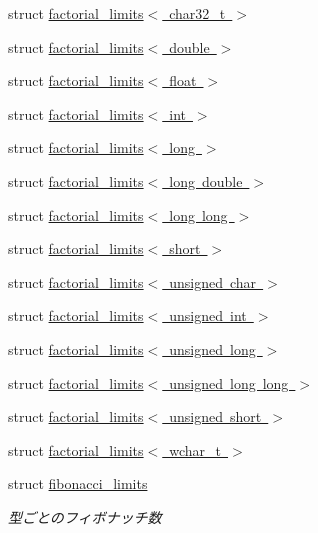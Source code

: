 \begin{DoxyCompactItemize}
\item 
struct \mbox{\hyperlink{structsaki_1_1factorial__limits_3_01char32__t_01_4}{factorial\+\_\+limits$<$ char32\+\_\+t $>$}}
\item 
struct \mbox{\hyperlink{structsaki_1_1factorial__limits_3_01double_01_4}{factorial\+\_\+limits$<$ double $>$}}
\item 
struct \mbox{\hyperlink{structsaki_1_1factorial__limits_3_01float_01_4}{factorial\+\_\+limits$<$ float $>$}}
\item 
struct \mbox{\hyperlink{structsaki_1_1factorial__limits_3_01int_01_4}{factorial\+\_\+limits$<$ int $>$}}
\item 
struct \mbox{\hyperlink{structsaki_1_1factorial__limits_3_01long_01_4}{factorial\+\_\+limits$<$ long $>$}}
\item 
struct \mbox{\hyperlink{structsaki_1_1factorial__limits_3_01long_01double_01_4}{factorial\+\_\+limits$<$ long double $>$}}
\item 
struct \mbox{\hyperlink{structsaki_1_1factorial__limits_3_01long_01long_01_4}{factorial\+\_\+limits$<$ long long $>$}}
\item 
struct \mbox{\hyperlink{structsaki_1_1factorial__limits_3_01short_01_4}{factorial\+\_\+limits$<$ short $>$}}
\item 
struct \mbox{\hyperlink{structsaki_1_1factorial__limits_3_01unsigned_01char_01_4}{factorial\+\_\+limits$<$ unsigned char $>$}}
\item 
struct \mbox{\hyperlink{structsaki_1_1factorial__limits_3_01unsigned_01int_01_4}{factorial\+\_\+limits$<$ unsigned int $>$}}
\item 
struct \mbox{\hyperlink{structsaki_1_1factorial__limits_3_01unsigned_01long_01_4}{factorial\+\_\+limits$<$ unsigned long $>$}}
\item 
struct \mbox{\hyperlink{structsaki_1_1factorial__limits_3_01unsigned_01long_01long_01_4}{factorial\+\_\+limits$<$ unsigned long long $>$}}
\item 
struct \mbox{\hyperlink{structsaki_1_1factorial__limits_3_01unsigned_01short_01_4}{factorial\+\_\+limits$<$ unsigned short $>$}}
\item 
struct \mbox{\hyperlink{structsaki_1_1factorial__limits_3_01wchar__t_01_4}{factorial\+\_\+limits$<$ wchar\+\_\+t $>$}}
\item 
struct \mbox{\hyperlink{structsaki_1_1fibonacci__limits}{fibonacci\+\_\+limits}}
\begin{DoxyCompactList}\small\item\em 型ごとのフィボナッチ数 \end{DoxyCompactList}\item 

\end{DoxyCompactItemize}
